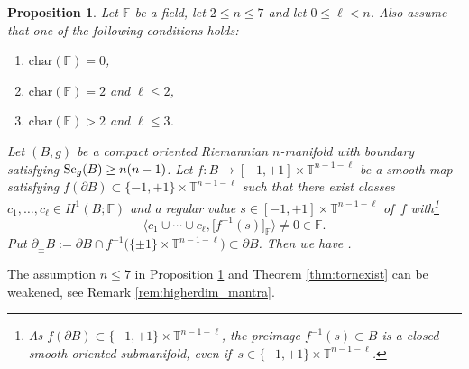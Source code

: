 \documentclass[10pt,a4paper]{amsart}
\numberwithin{equation}{section}
\newtheorem{Proposition}[Theorem]{Proposition}
\newcommand{\F}{\mathbb{F}}
\newcommand{\TTT}{\mathbb{T}}
\newcommand{\charac}{\mathrm{char}}
\newcommand{\Sc}{{\rm Sc}}
\newcommand{\myicon}{$\,\,\,\triangleright$}
\begin{document}
\begin{Proposition} \label{prop:bandwidth} Let $\F$ be a field, let $2 \leq n \leq 7$ and let $0 \leq \ell < n$.
Also assume that one of the following conditions holds:
\begin{enumerate}[\myicon]\itemsep=0pt
 \item $\charac(\F) = 0$,
 \item $\charac(\F) = 2$ and $\ell \leq 2$,
 \item $\charac(\F) > 2$ and $\ell \leq 3$.
\end{enumerate}

Let $(B, g)$ be a compact oriented Riemannian $n$-manifold with boundary satisfying $\Sc_g(B) \geq n(n-1)$.
Let
$
 f \colon B \to [-1, +1] \times {\TTT}^{n- 1 -\ell}
$
be a smooth map satisfying $f(\partial B) \subset \{ -1, +1\} \times {\TTT}^{n- 1-\ell}$ such that there exist classes $c_1, \ldots, c_\ell \in H^{1}(B; \F)$ and a regular value $s \in [-1, +1] \times {\TTT}^{n- 1 -\ell}$ of~$f$ with\footnote{As $f(\partial B) \subset \{-1, +1\} \times {\TTT}^{n-1-\ell}$, the preimage $f^{-1}(s) \subset B$ is a closed smooth oriented submanifold, even if~${s \in \{ -1, +1\} \times \TTT^{n-1-\ell}}$.}
\[
\big\langle c_1 \cup \cdots \cup c_\ell, \big[f^{-1}(s) \big]_\F \big\rangle \neq 0 \in \F .
\]
Put $\partial_{\pm} B:= \partial B \cap f^{-1}\big( \{ \pm 1\} \times {\TTT}^{n- 1-\ell} \big) \subset \partial B$.
Then we have .
\end{Proposition}

\begin{Remark} The assumption $n \leq 7$ in Proposition \ref{prop:bandwidth} and Theorem \ref{thm:tornexist} can be weakened, see Remark \ref{rem:higherdim_mantra}.
\end{Remark}
\end{document}

